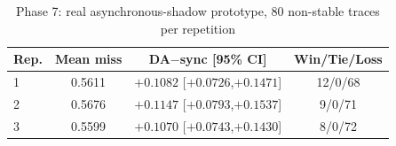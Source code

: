 \begin{table}[t]
\caption{Phase 7: real asynchronous-shadow prototype, 80 non-stable traces per repetition}
\label{tab:async_main}
\centering\footnotesize
\begin{tabular}{@{}lccc@{}}
\toprule
Rep. & Mean miss & DA$-\!$sync [95\% CI] & Win/Tie/Loss \\
\midrule
1 & 0.5611 & $+0.1082$ [$+0.0726$,$+0.1471$] & 12/0/68 \\
2 & 0.5676 & $+0.1147$ [$+0.0793$,$+0.1537$] & 9/0/71 \\
3 & 0.5599 & $+0.1070$ [$+0.0743$,$+0.1430$] & 8/0/72 \\
\bottomrule
\end{tabular}
\end{table}

